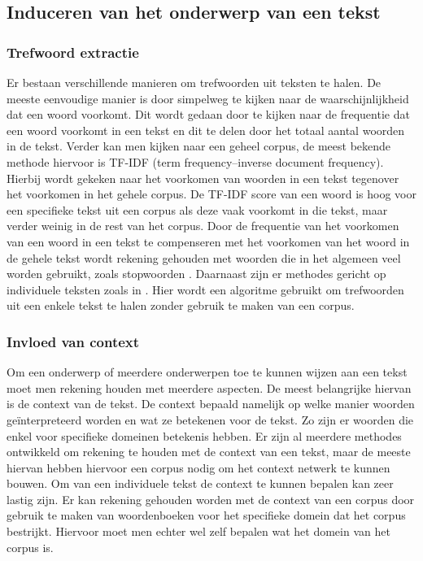 \subsection{Induceren van het onderwerp van een tekst}
\subsubsection{Trefwoord extractie}
Er bestaan verschillende manieren om trefwoorden uit teksten te halen. De meeste eenvoudige manier is door simpelweg te kijken naar de waarschijnlijkheid dat een woord voorkomt. Dit wordt gedaan door te kijken naar de frequentie dat een woord voorkomt in een tekst en dit te delen door het totaal aantal woorden in de tekst. Verder kan men kijken naar een geheel corpus, de meest bekende methode hiervoor is TF-IDF (term frequency–inverse document frequency)\citep{ramos2003using}. Hierbij wordt gekeken naar het voorkomen van woorden in een tekst tegenover het voorkomen in het gehele corpus. De TF-IDF score van een woord is hoog voor een specifieke tekst uit een corpus als deze vaak voorkomt in die tekst, maar verder weinig in de rest van het corpus. Door de frequentie van het voorkomen van een woord in een tekst te compenseren met het voorkomen van het woord in de gehele tekst wordt rekening gehouden met woorden die in het algemeen veel worden gebruikt, zoals stopwoorden \citep{aggarwal2012survey}. 
Daarnaast zijn er methodes gericht op individuele teksten zoals in \cite{matsuo2004keyword}. Hier wordt een algoritme gebruikt om trefwoorden uit een enkele tekst te halen zonder gebruik te maken van een corpus. 

\subsubsection{Invloed van context}
Om een onderwerp of meerdere onderwerpen toe te kunnen wijzen aan een tekst moet men rekening houden met meerdere aspecten. De meest belangrijke hiervan is de context van de tekst. De context bepaald namelijk op welke manier woorden geïnterpreteerd worden en wat ze betekenen voor de tekst. Zo zijn er woorden die enkel voor specifieke domeinen betekenis hebben. Er zijn al meerdere methodes ontwikkeld om rekening te houden met de context van een tekst, maar de meeste hiervan hebben hiervoor een corpus nodig om het context netwerk te kunnen bouwen. Om van een individuele tekst de context te kunnen bepalen kan zeer lastig zijn. Er kan rekening gehouden worden met de context van een corpus door gebruik te maken van woordenboeken voor het specifieke domein dat het corpus bestrijkt. Hiervoor moet men echter wel zelf bepalen wat het domein van het corpus is. \citep{aggarwal2012survey}